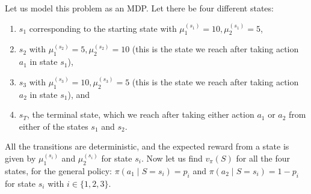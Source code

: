 \documentclass[a4paper, 10pt]{article}
\begin{document}
Let us model this problem as an MDP. Let there be four different states:
\begin{enumerate}
\item $s_1$ corresponding to the starting state with $\mu^{(s_1)}_1=10, \mu^{(s_1)}_2=5$,
\item $s_2$ with $\mu^{(s_2)}_1=5, \mu^{(s_2)}_2=10$ (this is the state we reach after taking action $a_1$ in state $s_1$),
\item $s_3$ with $\mu^{(s_3)}_1=10, \mu^{(s_3)}_2=5$ (this is the state we reach after taking action $a_2$ in state $s_1$), and
\item $s_T$, the terminal state, which we reach after taking either action $a_1$ or $a_2$ from either of the states $s_1$ and $s_2$.
\end{enumerate}

All the transitions are deterministic, and the expected reward from a state is given by $\mu^{(s_i)}_1$ and $\mu^{(s_i)}_2$ for state $s_i$. Now let us find $v_\pi(S)$ for all the four states, for the general policy: $\pi(a_1 \;|\; S=s_i) = p_i$ and $\pi(a_2 \;|\; S=s_i) = 1-p_i$ for state $s_i$ with $i \in \{1, 2, 3\}$.
\end{document}
